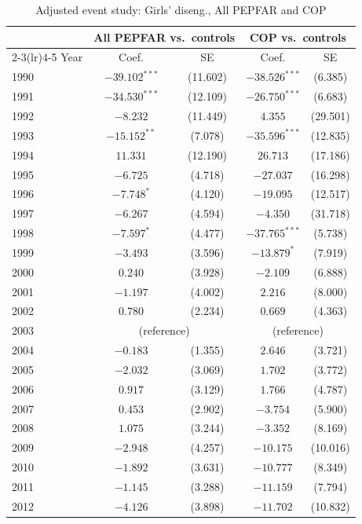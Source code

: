 \begin{table}[htbp]
\centering
\small
\caption{Adjusted event study: Girls' diseng., All PEPFAR and COP}
\label{tab:crown_es_combined_prim_disengage_girls}
\begin{tabular}{lcccc}
\toprule
 & \multicolumn{2}{c}{All PEPFAR vs.\ controls} & \multicolumn{2}{c}{COP vs.\ controls} \\
\cmidrule(lr){2-3}\cmidrule(lr){4-5}
Year & Coef. & SE & Coef. & SE \\
\midrule
1990 & $-39.102^{***}$ & (11.602) & $-38.526^{***}$ & (6.385) \\
1991 & $-34.530^{***}$ & (12.109) & $-26.750^{***}$ & (6.683) \\
1992 & $-8.232$ & (11.449) & $4.355$ & (29.501) \\
1993 & $-15.152^{**}$ & (7.078) & $-35.596^{***}$ & (12.835) \\
1994 & $11.331$ & (12.190) & $26.713$ & (17.186) \\
1995 & $-6.725$ & (4.718) & $-27.037$ & (16.298) \\
1996 & $-7.748^{*}$ & (4.120) & $-19.095$ & (12.517) \\
1997 & $-6.267$ & (4.594) & $-4.350$ & (31.718) \\
1998 & $-7.597^{*}$ & (4.477) & $-37.765^{***}$ & (5.738) \\
1999 & $-3.493$ & (3.596) & $-13.879^{*}$ & (7.919) \\
2000 & $0.240$ & (3.928) & $-2.109$ & (6.888) \\
2001 & $-1.197$ & (4.002) & $2.216$ & (8.000) \\
2002 & $0.780$ & (2.234) & $0.669$ & (4.363) \\
2003 & \multicolumn{2}{c}{(reference)} & \multicolumn{2}{c}{(reference)} \\
2004 & $-0.183$ & (1.355) & $2.646$ & (3.721) \\
2005 & $-2.032$ & (3.069) & $1.702$ & (3.772) \\
2006 & $0.917$ & (3.129) & $1.766$ & (4.787) \\
2007 & $0.453$ & (2.902) & $-3.754$ & (5.900) \\
2008 & $1.075$ & (3.244) & $-3.352$ & (8.169) \\
2009 & $-2.948$ & (4.257) & $-10.175$ & (10.016) \\
2010 & $-1.892$ & (3.631) & $-10.777$ & (8.349) \\
2011 & $-1.145$ & (3.288) & $-11.159$ & (7.794) \\
2012 & $-4.126$ & (3.898) & $-11.702$ & (10.832) \\

\end{tabular}
\end{table}
